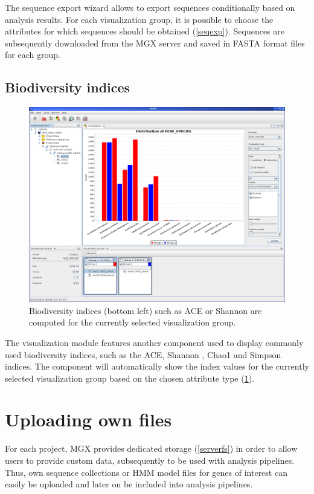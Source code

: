 The sequence export wizard allows to export sequences conditionally based on analysis results. For each
visualization group, it is possible to choose the attributes for which sequences should be obtained (\ref{seqexp}).
Sequences are subsequently downloaded from the MGX server and saved in FASTA format files for each group.


\subsection{Biodiversity indices}

\begin{figure}[H]
\centering
\includegraphics[width=\textwidth]{img/mgx/BioDiversity}
\caption[Biodiversity]{Biodiversity indices (bottom left) such as ACE or Shannon are computed for the currently
selected visualization group.}
\label{biodiv}
\end{figure}

The visualization module features another component used to display commonly used biodiversity indices, such as
the ACE, Shannon \cite{SHANNON}, Chao1 \cite{DIVERSITY} and Simpson \cite{SIMPSON} indices. The component will automatically show the index values for the
currently selected visualization group based on the chosen attribute type (\ref{biodiv}).


\section{Uploading own files}

For each project, MGX provides dedicated storage (\ref{serverfs}) in order to allow users to
provide custom data, subsequently to be used with analysis pipelines. Thus,
own sequence collections or HMM model files for genes of interest can easily
be uploaded and later on be included into analysis pipelines.\\

